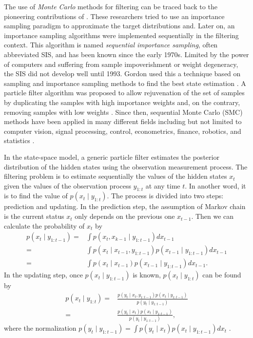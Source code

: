 The use of \textit{Monte Carlo} methods for filtering can be traced back to the pioneering contributions of \citep{handschin1969monte, handschin1970monte}. These researchers tried to use an importance sampling paradigm to approximate the target distributions and. Later on, an importance sampling algorithms were implemented sequentially in the filtering context. This algorithm is named \textit{sequential importance sampling}, often abbreviated SIS, and has been known since the early 1970s. Limited by the power of computers and suffering from sample impoverishment or weight degeneracy, the SIS did not develop well until 1993. Gordon used this a technique based on sampling and importance sampling methods to find the best state estimation \citep{gordon1993novel}. A particle filter algorithm was proposed to allow rejuvenation of the set of samples by duplicating the samples with high importance weights and, on the contrary, removing samples with low weights \citep{cappe2009inference}. Since then, sequential Monte Carlo (SMC) methods have been applied in many different fields including but not limited to computer vision, signal processing, control, econometrics, finance, robotics, and statistics \citep{smcmip2011, ristic2004beyond}.

In the state-space model, a generic particle filter estimates the posterior distribution of the hidden states using the observation measurement process. The filtering problem is to estimate sequentially the values of the hidden states $x_t$ given the values of the observation process $y_{1:t}$ at any time $t$. In another word, it is to find the value of $p(x_t  \mid  y_{1:t})$. The process is divided into two steps: prediction and updating. In the prediction step, the assumption of Markov chain is the current status $x_t $ only depends on the previous one $x_{t-1}$. Then we can calculate the probability of $x_t$ by 
\begin{align*}
p(x_t \mid y_{1:t-1})=&\int p(x_t ,x_{k-1}\mid y_{1:t-1}) dx_{t-1}\\
=&\int p(x_t \mid x_{t-1},y_{1:t-1}) p(x_{t-1}\mid y_{1:t-1})dx_{t-1}\\
=&\int p(x_t \mid x_{t-1}) p(x_{t-1}\mid y_{1:t-1})dx_{t-1}.
\end{align*}
In the updating step, once $p(x_t \mid y_{1:t-1})$ is known, $p(x_t \mid y_{1:t})$ can be found by
\begin{align*}
p(x_t \mid y_{1:t})=&\frac{p(y_t \mid x_t ,y_{1:t-1})p(x_{t}\mid y_{1:t-1})}{p(y_t \mid  y_{1:t-1})} \\
=&\frac{p(y_t \mid x_t )p(x_{t}\mid y_{1:t-1})}{p(y_t \mid  y_{1:t-1})},
\end{align*}
where the normalization $p(y_t \mid  y_{1:t-1})=\int p(y_t \mid x_t )p(x_t \mid  y_{1:t-1}) dx_t $ \citep{arulampalam2002tutorial}.

